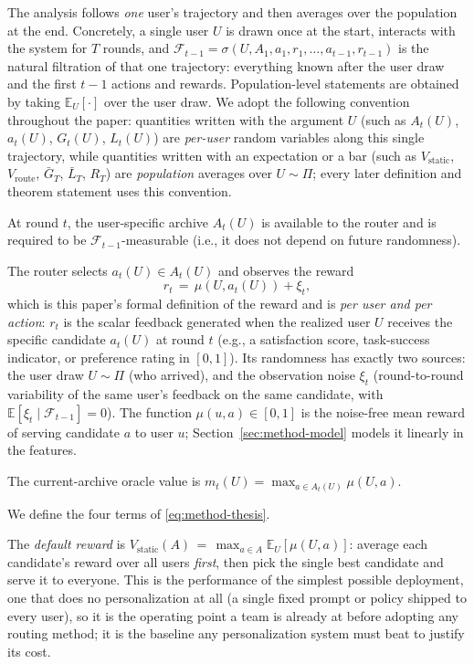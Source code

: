 \documentclass{article} %
\providecommand{\E}{\mathbb{E}}
\begin{document}
The analysis follows \emph{one} user's trajectory and then averages over the population at the end. Concretely, a single user $U$ is drawn once at the start, interacts with the system for $T$ rounds, and $\mathcal{F}_{t-1} = \sigma(U, A_1, a_1, r_1, \ldots, a_{t-1}, r_{t-1})$ is the natural filtration of that one trajectory: everything known after the user draw and the first $t-1$ actions and rewards. Population-level statements are obtained by taking $\E_U[\cdot]$ over the user draw. We adopt the following convention throughout the paper: quantities written with the argument $U$ (such as $A_t(U)$, $a_t(U)$, $G_t(U)$, $L_t(U)$) are \emph{per-user} random variables along this single trajectory, while quantities written with an expectation or a bar (such as $V_{\mathrm{static}}$, $V_{\mathrm{route}}$, $\bar G_T$, $\bar L_T$, $R_T$) are \emph{population} averages over $U \sim \Pi$; every later definition and theorem statement uses this convention.

At round $t$, the user-specific archive $A_t(U)$ is available to the router and is required to be $\mathcal{F}_{t-1}$-measurable (i.e., it does not depend on future randomness).

The router selects $a_t(U) \in A_t(U)$ and observes the reward
\[
r_t \,=\, \mu(U, a_t(U)) + \xi_t ,
\]
which is this paper's formal definition of the reward and is \emph{per user and per action}: $r_t$ is the scalar feedback generated when the realized user $U$ receives the specific candidate $a_t(U)$ at round $t$ (e.g., a satisfaction score, task-success indicator, or preference rating in $[0,1]$). Its randomness has exactly two sources: the user draw $U \sim \Pi$ (who arrived), and the observation noise $\xi_t$ (round-to-round variability of the same user's feedback on the same candidate, with $\E[\xi_t \mid \mathcal{F}_{t-1}] = 0$). The function $\mu(u,a) \in [0,1]$ is the noise-free mean reward of serving candidate $a$ to user $u$; Section~\ref{sec:method-model} models it linearly in the features.

The current-archive oracle value is $m_t(U) = \max_{a \in A_t(U)} \mu(U,a)$.

We define the four terms of \eqref{eq:method-thesis}.

The \emph{default reward} is $V_{\mathrm{static}}(A) \,=\, \max_{a \in A} \E_{U}[\mu(U,a)]$: average each candidate's reward over all users \emph{first}, then pick the single best candidate and serve it to everyone. This is the performance of the simplest possible deployment, one that does no personalization at all (a single fixed prompt or policy shipped to every user), so it is the operating point a team is already at before adopting any routing method; it is the baseline any personalization system must beat to justify its cost.
\end{document}
